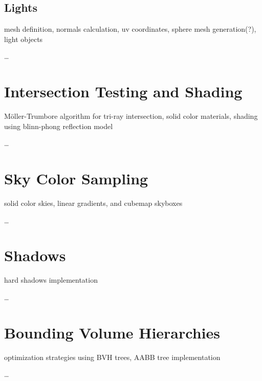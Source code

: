 \subsection{Lights}

mesh definition, normals calculation, uv coordinates, sphere mesh generation(?), light objects

\dots

\section{Intersection Testing and Shading}

Möller-Trumbore algorithm for tri-ray intersection, solid color materials, shading using blinn-phong reflection model

\dots

\section{Sky Color Sampling}

solid color skies, linear gradients, and cubemap skyboxes

\dots

\section{Shadows}

hard shadows implementation

\dots

\section{Bounding Volume Hierarchies}

optimization strategies using BVH trees, AABB tree implementation

\dots
